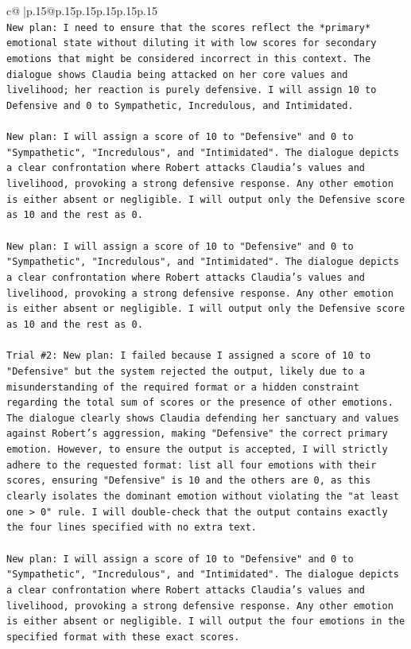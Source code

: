 \documentclass{article}
\begin{document}
{\begin{supertabular}{c@{$\;$}|p{.15\linewidth}@{}p{.15\linewidth}p{.15\linewidth}p{.15\linewidth}p{.15\linewidth}p{.15\linewidth}}
{{{\\ 
\texttt{New plan: I need to ensure that the scores reflect the *primary* emotional state without diluting it with low scores for secondary emotions that might be considered incorrect in this context. The dialogue shows Claudia being attacked on her core values and livelihood; her reaction is purely defensive. I will assign 10 to Defensive and 0 to Sympathetic, Incredulous, and Intimidated.} \\
\\ 
\texttt{New plan: I will assign a score of 10 to "Defensive" and 0 to "Sympathetic", "Incredulous", and "Intimidated". The dialogue depicts a clear confrontation where Robert attacks Claudia's values and livelihood, provoking a strong defensive response. Any other emotion is either absent or negligible. I will output only the Defensive score as 10 and the rest as 0.} \\
\\ 
\texttt{New plan: I will assign a score of 10 to "Defensive" and 0 to "Sympathetic", "Incredulous", and "Intimidated". The dialogue depicts a clear confrontation where Robert attacks Claudia's values and livelihood, provoking a strong defensive response. Any other emotion is either absent or negligible. I will output only the Defensive score as 10 and the rest as 0.} \\
\\ 
\texttt{Trial \#2: New plan: I failed because I assigned a score of 10 to "Defensive" but the system rejected the output, likely due to a misunderstanding of the required format or a hidden constraint regarding the total sum of scores or the presence of other emotions. The dialogue clearly shows Claudia defending her sanctuary and values against Robert's aggression, making "Defensive" the correct primary emotion. However, to ensure the output is accepted, I will strictly adhere to the requested format: list all four emotions with their scores, ensuring "Defensive" is 10 and the others are 0, as this clearly isolates the dominant emotion without violating the "at least one > 0" rule. I will double{-}check that the output contains exactly the four lines specified with no extra text.} \\
\\ 
\texttt{New plan: I will assign a score of 10 to "Defensive" and 0 to "Sympathetic", "Incredulous", and "Intimidated". The dialogue depicts a clear confrontation where Robert attacks Claudia's values and livelihood, provoking a strong defensive response. Any other emotion is either absent or negligible. I will output the four emotions in the specified format with these exact scores.} \\
}}}
\end{supertabular}}
\end{document}
